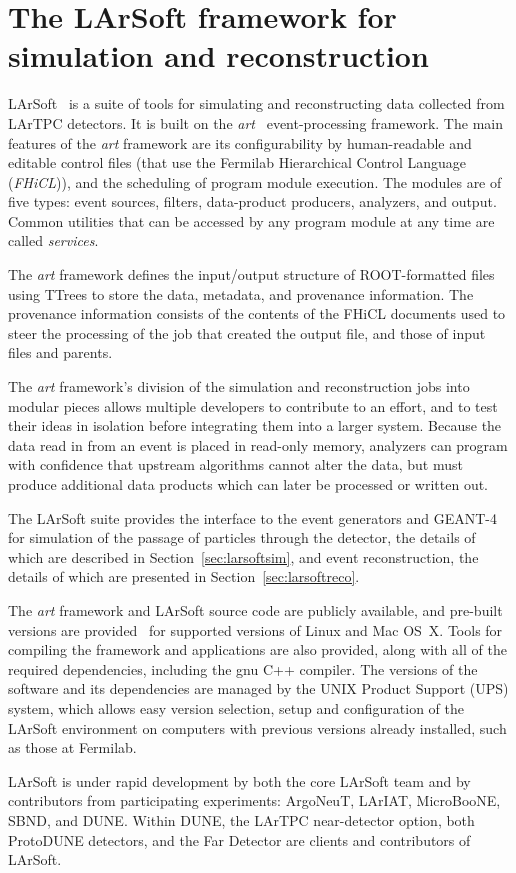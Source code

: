 \section{The LArSoft framework for simulation and reconstruction} 
\label{sec:comp:larsoft}

LArSoft~\cite{larsoft-web} is a suite of tools for simulating and
reconstructing data collected from LArTPC detectors.  It is
built on the \textit{art}~\cite{art-web} event-processing framework.  The
main features of the \textit{art} framework are 
its configurability by
human-readable and editable control files (that use the Fermilab
Hierarchical Control Language (\textit{FHiCL})), and
the scheduling of 
program module execution. The modules are of five types: event sources, filters,
data-product producers, analyzers, and output.  
Common utilities that
can be accessed by any program module at any time are called \textit{services}.

The \textit{art} framework defines the input/output structure of
ROOT-formatted files using TTrees to store the data, metadata, and
provenance information.  The provenance information consists of the
contents of the FHiCL documents used to steer the processing of the
job that created the output file, and those of input files and parents.  

The \textit{ art} framework's division of the simulation and reconstruction
jobs into modular pieces allows multiple developers to contribute to an
effort, and to test their ideas in isolation before integrating them
into a larger system.  Because the data read in from an event is
placed in read-only memory, analyzers can program with confidence that
upstream algorithms cannot alter the data, but must produce additional
data products which can later be processed or written out.

The LArSoft suite provides the interface to the event generators and
GEANT-4~\cite{Agostinelli:2002hh} 
for simulation of the passage of particles
through the detector, the details of which are described in
Section~\ref{sec:larsoftsim}, and event reconstruction, the details of
which are presented in Section~\ref{sec:larsoftreco}.  

The \textit{art}
framework and LArSoft source code are publicly available, and pre-built
versions are provided~\cite{scisoft-web} for supported versions of Linux and Mac
OS~X.  Tools for compiling the framework and
applications are also provided, along with all of the required
dependencies, including the gnu C++ compiler.  The versions of the
software and its dependencies are managed by the UNIX Product Support (UPS) system,
which allows easy version selection, setup and configuration of the LArSoft
environment on computers with previous versions already installed, such as
those at Fermilab.  

LArSoft is under rapid development by both the
core LArSoft team and by contributors from participating experiments:
ArgoNeuT, LArIAT, MicroBooNE, SBND, and DUNE.  Within DUNE, the LArTPC
near-detector option, both ProtoDUNE detectors, and the Far Detector
are clients and contributors of LArSoft.